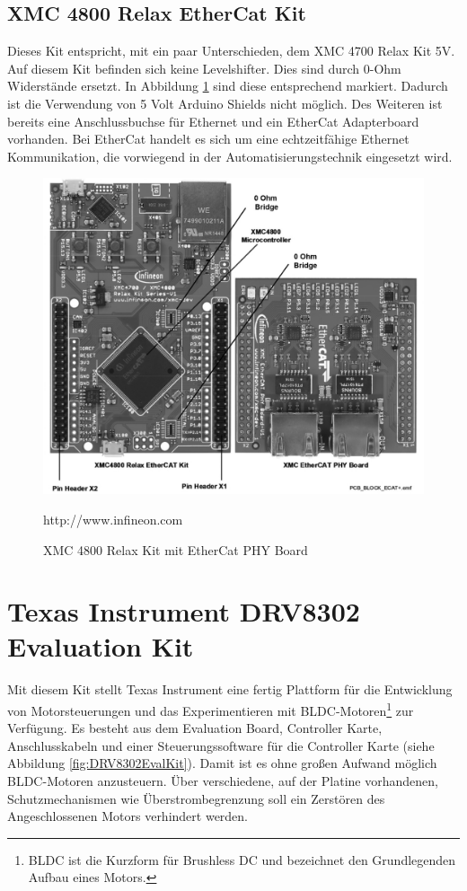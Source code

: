 

\subsection{XMC 4800 Relax EtherCat Kit}
\label{sec:XMC4800}
Dieses Kit entspricht, mit ein paar Unterschieden, dem XMC 4700 Relax Kit 5V.
Auf diesem Kit befinden sich keine Levelshifter.
Dies sind durch 0-Ohm Widerstände ersetzt.
In Abbildung \ref{fig:XMC4800} sind diese entsprechend markiert.
Dadurch ist die Verwendung von 5 Volt Arduino Shields nicht möglich.
Des Weiteren ist bereits eine Anschlussbuchse für Ethernet und ein EtherCat Adapterboard vorhanden.
Bei EtherCat handelt es sich um eine echtzeitfähige Ethernet Kommunikation, die vorwiegend in der Automatisierungstechnik eingesetzt wird. 

\begin{figure}[hptb]
	\centering
	\includegraphics[width=\textwidth-4cm]{hardware/graphics/XMC_4800_Board_with_EtherCAT}
	\caption{XMC 4800 Relax Kit mit EtherCat PHY Board}
	\quelle http://www.infineon.com
	\label{fig:XMC4800}
\end{figure}



\section{Texas Instrument DRV8302 Evaluation Kit}	
\label{sec:TI DRV8302 EvalKit}
Mit diesem Kit stellt Texas Instrument eine fertig Plattform für die Entwicklung von Motorsteuerungen und das Experimentieren mit BLDC-Motoren\footnote{BLDC ist die Kurzform für Brushless DC und bezeichnet den Grundlegenden Aufbau eines Motors.} zur Verfügung.
Es besteht aus dem Evaluation Board, Controller Karte, Anschlusskabeln und einer Steuerungssoftware für die Controller Karte (siehe Abbildung \ref{fig:DRV8302EvalKit}).
Damit ist es ohne großen Aufwand möglich BLDC-Motoren anzusteuern.
Über verschiedene, auf der Platine vorhandenen, Schutzmechanismen wie Überstrombegrenzung soll ein Zerstören des Angeschlossenen Motors verhindert werden.

